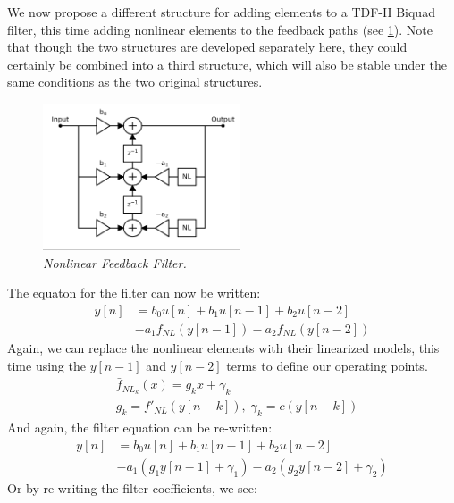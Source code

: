 \documentclass{IEEEtran}
\begin{document}
%
We now propose a different structure for adding elements to a TDF-II
Biquad filter, this time adding nonlinear elements to the feedback
paths (see \cref{NL2-TDF-II}). Note that though the two structures are developed
separately here, they could certainly be combined into a third structure,
which will also be stable under the same conditions as the two original
structures.
%
\begin{figure}[ht]
    \center
    \includegraphics[width=2.3in]{../../NonlinearFeedback/Pics/NL2-TDF-II-White.png}
    \caption{\label{NL2-TDF-II}{\it Nonlinear Feedback Filter.}}
\end{figure}
%
The equaton for the filter can now be written:
%
\begin{equation}
    \begin{split}
        y[n] &= b_0 u[n] + b_1 u[n-1] + b_2 u[n-2] \\
             &- a_1 f_{NL}(y[n-1]) - a_2 f_{NL}(y[n-2])
    \end{split}
        \label{eq:nlbq2}
\end{equation}
%
Again, we can replace the nonlinear elements with their linearized
models, this time using the $y[n-1]$ and $y[n-2]$ terms to define our
operating points.
%
\begin{equation}
    \begin{split}
        & \bar{f}_{NL_k}(x) = g_k x + \gamma_k \\
        & g_k = f'_{NL}(y[n-k]), \; \gamma_k = c(y[n-k])
    \end{split}
        \label{eq:gs2}
\end{equation}
%
And again, the filter equation can be re-written:
%
\begin{equation}
    \begin{split}
        y[n] & = b_0 u[n] + b_1 u[n-1] + b_2 u[n-2] \\
        & - a_1 (g_1 y[n-1] + \gamma_1)
        - a_2 (g_2 y[n-2] + \gamma_2)
    \end{split}
        \label{eq:nlbq2_rewrite}
\end{equation}
%
Or by re-writing the filter coefficients, we see:
\end{document}
